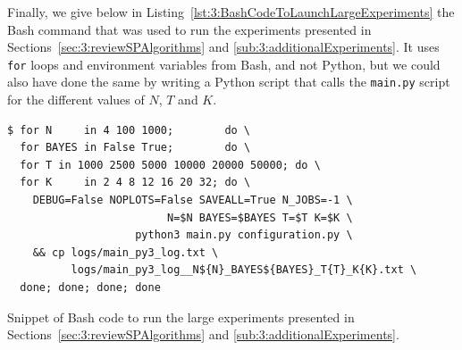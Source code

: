 Finally, we give below in Listing~\ref{lst:3:BashCodeToLaunchLargeExperiments} the Bash command that was used to run the experiments presented in Sections~\ref{sec:3:reviewSPAlgorithms} and \ref{sub:3:additionalExperiments}.
It uses \texttt{for} loops and environment variables from Bash, and not Python, but we could also have done the same by writing a Python script that calls the \texttt{main.py} script for the different values of $N$, $T$ and $K$.

\begin{listing}[h!]
    \begin{verbatim}
$ for N     in 4 100 1000;        do \
  for BAYES in False True;        do \
  for T in 1000 2500 5000 10000 20000 50000; do \
  for K     in 2 4 8 12 16 20 32; do \
    DEBUG=False NOPLOTS=False SAVEALL=True N_JOBS=-1 \
                         N=$N BAYES=$BAYES T=$T K=$K \
                    python3 main.py configuration.py \
    && cp logs/main_py3_log.txt \
          logs/main_py3_log__N${N}_BAYES${BAYES}_T{T}_K{K}.txt \
  done; done; done; done
    \end{verbatim}
    \caption{Snippet of Bash code to run the large experiments presented in Sections~\ref{sec:3:reviewSPAlgorithms} and \ref{sub:3:additionalExperiments}.}
    \label{lst:3:BashCodeToLaunchLargeExperiments}
\end{listing}







